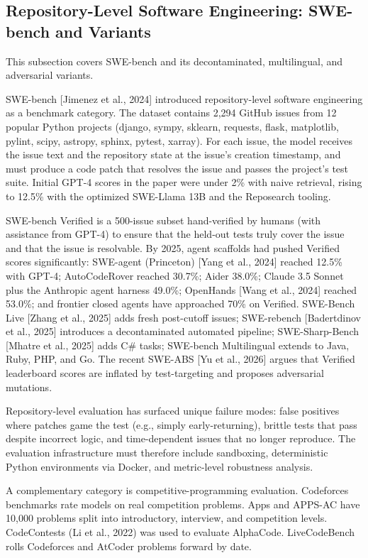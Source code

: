 \subsection{Repository-Level Software Engineering: SWE-bench and Variants}\label{repository-level-software-engineering-swe-bench-and-variants}

This subsection covers SWE-bench and its decontaminated, multilingual, and adversarial variants.

SWE-bench {[}Jimenez et al., 2024{]} introduced repository-level software engineering as a benchmark category. The dataset contains 2,294 GitHub issues from 12 popular Python projects (django, sympy, sklearn, requests, flask, matplotlib, pylint, scipy, astropy, sphinx, pytest, xarray). For each issue, the model receives the issue text and the repository state at the issue's creation timestamp, and must produce a code patch that resolves the issue and passes the project's test suite. Initial GPT-4 scores in the paper were under 2\% with naive retrieval, rising to 12.5\% with the optimized SWE-Llama 13B and the Reposearch tooling.

SWE-bench Verified is a 500-issue subset hand-verified by humans (with assistance from GPT-4) to ensure that the held-out tests truly cover the issue and that the issue is resolvable. By 2025, agent scaffolds had pushed Verified scores significantly: SWE-agent (Princeton) {[}Yang et al., 2024{]} reached 12.5\% with GPT-4; AutoCodeRover reached 30.7\%; Aider 38.0\%; Claude 3.5 Sonnet plus the Anthropic agent harness 49.0\%; OpenHands {[}Wang et al., 2024{]} reached 53.0\%; and frontier closed agents have approached 70\% on Verified. SWE-Bench Live {[}Zhang et al., 2025{]} adds fresh post-cutoff issues; SWE-rebench {[}Badertdinov et al., 2025{]} introduces a decontaminated automated pipeline; SWE-Sharp-Bench {[}Mhatre et al., 2025{]} adds C\# tasks; SWE-bench Multilingual extends to Java, Ruby, PHP, and Go. The recent SWE-ABS {[}Yu et al., 2026{]} argues that Verified leaderboard scores are inflated by test-targeting and proposes adversarial mutations.

Repository-level evaluation has surfaced unique failure modes: false positives where patches game the test (e.g., simply early-returning), brittle tests that pass despite incorrect logic, and time-dependent issues that no longer reproduce. The evaluation infrastructure must therefore include sandboxing, deterministic Python environments via Docker, and metric-level robustness analysis.

A complementary category is competitive-programming evaluation. Codeforces benchmarks rate models on real competition problems. Apps and APPS-AC have 10,000 problems split into introductory, interview, and competition levels. CodeContests (Li et al., 2022) was used to evaluate AlphaCode. LiveCodeBench rolls Codeforces and AtCoder problems forward by date.


